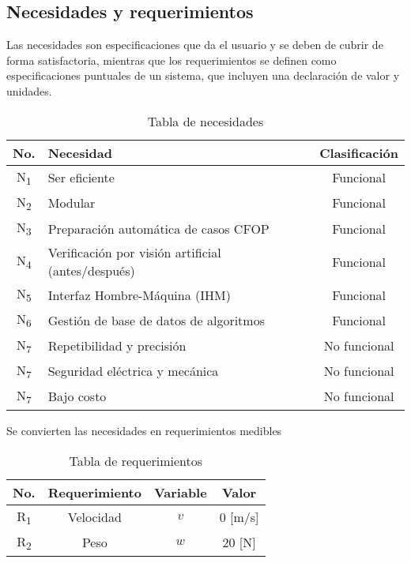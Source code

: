 \subsection{Necesidades y requerimientos}

Las necesidades son especificaciones que da el usuario y se deben de cubrir de forma satisfactoria, mientras
que los requerimientos se definen como especificaciones puntuales de un sistema, que incluyen una
declaración de valor y unidades.\\

\begin{table}[h]
	\centering
	\caption{Tabla de necesidades}
	\begin{tabular}{clc}
		\toprule
		\textbf{No.} & \textbf{Necesidad} & \textbf{Clasificación} \\ \midrule
		N\textsubscript{1} &   Ser eficiente    &       Funcional        \\
        N\textsubscript{2} &   Modular          &       Funcional        \\
		N\textsubscript{3} &   Preparación automática de casos CFOP    &       Funcional        \\
        N\textsubscript{4} &   Verificación por visión artificial (antes/después)    &       Funcional        \\
        N\textsubscript{5} &   Interfaz Hombre-Máquina (IHM)    &       Funcional        \\
		N\textsubscript{6} &   Gestión de base de datos de algoritmos       &      Funcional      \\
        N\textsubscript{7} &   Repetibilidad y precisión    &      No funcional      \\
        N\textsubscript{7} &   Seguridad eléctrica y mecánica    &      No funcional      \\
        N\textsubscript{7} &   Bajo costo    &      No funcional      \\ \bottomrule
	\end{tabular}
\end{table}

\FloatBarrier
Se convierten las necesidades en requerimientos medibles

\begin{table}[h]
	\centering
	\caption{Tabla de requerimientos}
	\begin{tabular}{cccc}
		\toprule
		\textbf{No.} & \textbf{Requerimiento} & \textbf{Variable} & \textbf{Valor} \\ \midrule
	 R\textsubscript{1}   &       Velocidad        &       $ v $       &    0 [m/s]     \\
	 R\textsubscript{2}   &          Peso          &       $ w $       &     20 [N]     \\ \bottomrule
	\end{tabular}
\end{table}
\FloatBarrier




